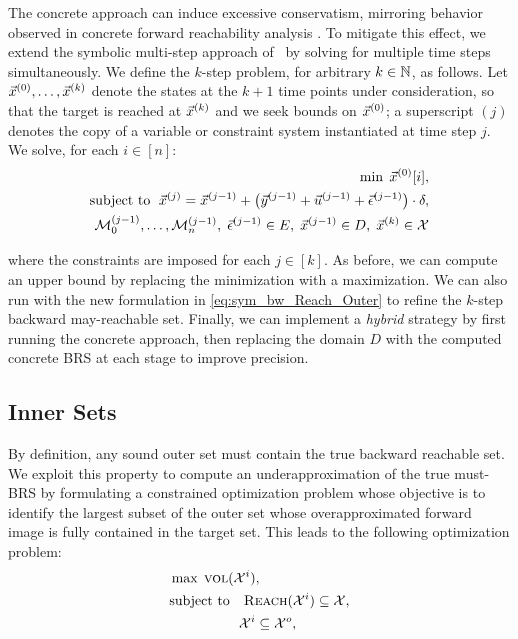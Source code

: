 \documentclass[letterpaper, 10 pt, conference]{ieeeconf}  %
\begin{document}
The concrete approach can induce excessive conservatism, mirroring behavior observed in concrete forward reachability analysis \cite{akinwande2025verifying}. To mitigate this effect, we extend the symbolic multi-step approach of~\cite{akinwande2025verifying,sidrane2022overt} by solving for multiple time steps simultaneously.
We define the $k$-step problem, for arbitrary $k \in \mathbb{N}$, as follows. Let $\vec{x}^{(0)},\dots,\vec{x}^{(k)}$ denote the states at the $k+1$ time points under consideration, so that the target is reached at $\vec{x}^{(k)}$ and we seek bounds on $\vec{x}^{(0)}$; a superscript $(j)$ denotes the copy of a variable or constraint system instantiated at time step $j$. We solve, for each $i \in [n]$:
\vspace*{-0.8em}
\begin{equation}
\begin{aligned}
    \min \; \vec{x}^{(0)}[i], & \\
    \text{subject to }
    \; \vec{x}^{(j)} = \vec{x}^{(j-1)} + \big(\vec{y}^{(j-1)} + \vec{u}^{(j-1)} + \vec{\epsilon}^{(j-1)}\big)\cdot\delta, & \\
    \mathcal{M}^{(j-1)}_0,\dots,\mathcal{M}^{(j-1)}_n, \;
    \vec{\epsilon}^{(j-1)} \in E, \;
    \vec{x}^{(j-1)} \in D, \;
    \vec{x}^{(k)} \in \mathcal{X} &
\end{aligned}
\label{eq:sym_bw_Reach_Outer}
\end{equation}

\noindent
where the constraints are imposed for each $j \in [k]$.
As before, we can compute an upper bound by replacing the minimization with a maximization. We can also run  with the new formulation in \eqref{eq:sym_bw_Reach_Outer} to refine the $k$-step backward may-reachable set. Finally, we can implement a \emph{hybrid} strategy by first running the concrete approach, then replacing the domain $D$ with the computed concrete BRS at each stage to improve precision.


\subsection{Inner Sets}

By definition, any sound outer set must contain the true backward reachable set. We exploit this property to compute an underapproximation of the true must-BRS by formulating a constrained optimization problem whose objective is to identify the largest subset of the outer set whose overapproximated forward image is fully contained in the target set. This leads to the following optimization problem:
\begin{subequations}
\begin{align}
    &\max \;\textsc{vol}(\mathcal{X}^i), \\
    &\text{subject to} \quad 
      \textsc{Reach}(\mathcal{X}^i) \subseteq \mathcal{X}, \\
    & \qquad\qquad\quad 
      \mathcal{X}^i \subseteq \mathcal{X}^o,
\end{align}
\label{eq:bw_Reach_inner}
\end{subequations}
\end{document}
